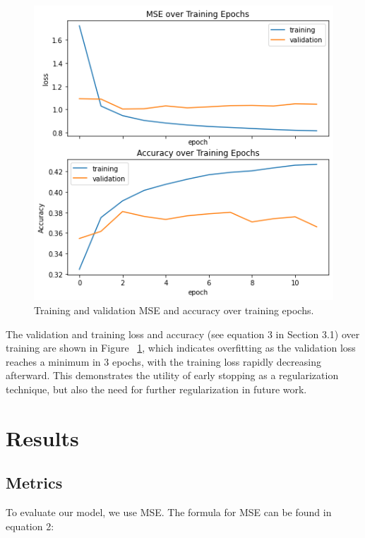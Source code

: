 \documentclass{bioinfo}
\begin{document}
\begin{methods}
\begin{figure}[H]
    \centering
    \includegraphics[width=\columnwidth]{figures/results.png}
    \caption{Training and validation MSE and accuracy over training epochs.}
    \label{fig:curves}
\end{figure}


The validation and training loss and accuracy (see equation 3 in Section 3.1) over training are shown in Figure ~\ref{fig:curves}, which indicates overfitting as the validation loss reaches a minimum in 3 epochs, with the training loss rapidly decreasing afterward. This demonstrates the utility of early stopping as a regularization technique, but also the need for further regularization in future work.


\end{methods}

\section{Results}

\subsection{Metrics}

To evaluate our model, we use MSE. The formula for MSE can be found in equation 2:
\end{document}
